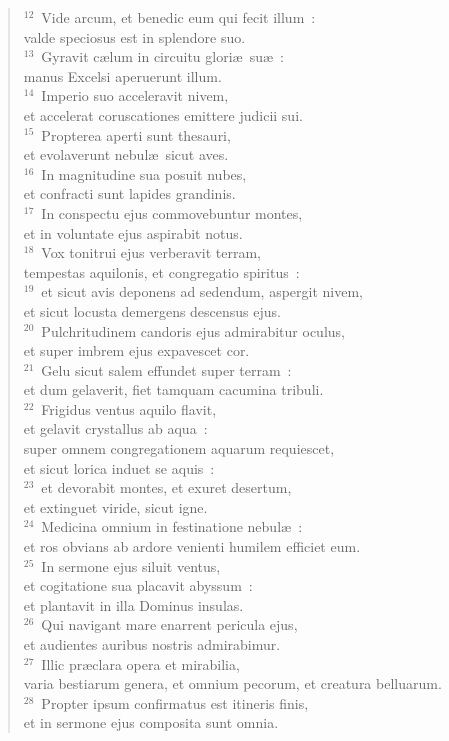 \begin{verse}${}^{12}$~Vide arcum, et benedic eum qui fecit illum~:\\ valde speciosus est in splendore suo.\\
${}^{13}$~Gyravit c\ae lum in circuitu glori\ae\ su\ae~:\\ manus Excelsi aperuerunt illum.\\
${}^{14}$~Imperio suo acceleravit nivem,\\ et accelerat coruscationes emittere judicii sui.\\
${}^{15}$~Propterea aperti sunt thesauri,\\ et evolaverunt nebul\ae\ sicut aves.\\
${}^{16}$~In magnitudine sua posuit nubes,\\ et confracti sunt lapides grandinis.\\
${}^{17}$~In conspectu ejus commovebuntur montes,\\ et in voluntate ejus aspirabit notus.\\
${}^{18}$~Vox tonitrui ejus verberavit terram,\\ tempestas aquilonis, et congregatio spiritus~:\\
${}^{19}$~et sicut avis deponens ad sedendum, aspergit nivem,\\ et sicut locusta demergens descensus ejus.\\
${}^{20}$~Pulchritudinem candoris ejus admirabitur oculus,\\ et super imbrem ejus expavescet cor.\\
${}^{21}$~Gelu sicut salem effundet super terram~:\\ et dum gelaverit, fiet tamquam cacumina tribuli.\\
${}^{22}$~Frigidus ventus aquilo flavit,\\ et gelavit crystallus ab aqua~:\\ super omnem congregationem aquarum requiescet,\\ et sicut lorica induet se aquis~:\\
${}^{23}$~et devorabit montes, et exuret desertum,\\ et extinguet viride, sicut igne.\\
${}^{24}$~Medicina omnium in festinatione nebul\ae~:\\ et ros obvians ab ardore venienti humilem efficiet eum.\\
${}^{25}$~In sermone ejus siluit ventus,\\ et cogitatione sua placavit abyssum~:\\ et plantavit in illa Dominus insulas.\\
${}^{26}$~Qui navigant mare enarrent pericula ejus,\\ et audientes auribus nostris admirabimur.\\
${}^{27}$~Illic pr\ae clara opera et mirabilia,\\ varia bestiarum genera, et omnium pecorum, et creatura belluarum.\\
${}^{28}$~Propter ipsum confirmatus est itineris finis,\\ et in sermone ejus composita sunt omnia.\end{verse}


